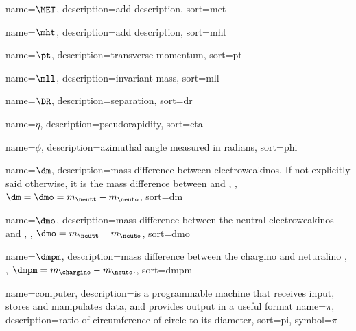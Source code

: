 

{
  name={\ensuremath{\MET}},
  description={add description},
  sort={met}
}


{
  name={\ensuremath{\mht}},
  description={add description},
  sort={mht}
}
 
{
  name={\ensuremath{\pt}},
  description={transverse momentum},
  sort={pt}
}

{
  name={\ensuremath{\mll}},
  description={invariant mass},
  sort={mll}
}

{
  name={\ensuremath{\DR}},
  description={separation},
  sort={dr}
}

{
  name={\ensuremath{\eta}},
  description={pseudorapidity},
  sort={eta}
}

{
  name={\ensuremath{\phi}},
  description={azimuthal angle measured in radians},
  sort={phi}
}

{
  name={\ensuremath{\dm}},
  description={mass difference between electroweakinos. If not explicitly said otherwise, it is the mass difference between \neutt and \neuto, \ie, $\dm=\dmo=m_\neutt-m_\neuto$},
  sort={dm}
}

{
  name={\ensuremath{\dmo}},
  description={mass difference between the neutral electroweakinos \neutt and \neuto, \ie, $\dmo=m_\neutt-m_\neuto$},
  sort={dmo}
}

{
  name={\ensuremath{\dmpm}},
  description={mass difference between the chargino \chargino and neturalino \neuto, \ie, $\dmpm=m_\chargino-m_\neuto$.},
  sort={dmpm}
}

{
  name=computer,
  description={is a programmable machine that receives input,
               stores and manipulates data, and provides
               output in a useful format}
}
{
name={\ensuremath{\pi}},
description={ratio of circumference of circle to its diameter},
sort=pi,
symbol={\ensuremath{\pi}}
 }